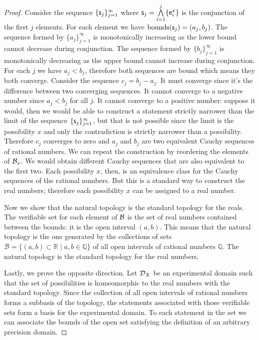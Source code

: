 \documentclass[11pt,letterpaper,fleqn]{memoir} %
\begin{document}
\begin{mathSection}
\begin{proof}
		Consider the sequence $\{\stmt_j\}_{j=1}^{\infty}$ where $\stmt_j = \bigAND\limits_{i=1}^j\{\obs[e]^x_i\}$ is the conjunction of the first $j$ elements. For each element we have $\operatorname{bounds}(\stmt_j) = (a_j, b_j)$. The sequence formed by $\{a_j\}_{j=1}^{\infty}$ is monotonically increasing as the lower bound cannot decrease during conjunction. The sequence formed by $\{b_j\}_{j=1}^{\infty}$ is monotonically decreasing as the upper bound cannot increase during conjunction. For each $j$ we have $a_j < b_j$, therefore both sequences are bound which means they both converge. Consider the sequence $c_j = b_j - a_j$. It must converge since it's the difference between two converging sequences. It cannot converge to a negative number since $a_j < b_j$ for all $j$. It cannot converge to a positive number: suppose it would, then we would be able to construct a statement strictly narrower than the limit of the sequence $\{\stmt_j\}_{j=1}^{\infty}$, but that is not possible since the limit is the possibility $x$ and only the contradiction is strictly narrower than a possibility. Therefore $c_j$ converges to zero and $a_j$ and $b_j$ are two equivalent Cauchy sequences of rational numbers. We can repeat the construction by reordering the elements of $\basis_x$. We would obtain different Cauchy sequences that are also equivalent to the first two. Each possibility $x$, then, is an equivalence class for the Cauchy sequences of the rational numbers. But this is a standard way to construct the real numbers; therefore each possibility $x$ can be assigned to a real number.
		
		Now we show that the natural topology is the standard topology for the reals. The verifiable set for each element of $\basis$ is the set of real numbers contained between the bounds: it is the open interval $(a,b)$. This means that the natural topology is the one generated by the collections of sets $\mathcal{B} = \{ (a,b) \subset \mathbb{R} \; | \; a,b \in \mathbb{Q} \}$ of all open intervals of rational numbers $\mathbb{Q}$. The natural topology is the standard topology for the real numbers.
		
		Lastly, we prove the opposite direction. Let $\edomain_X$ be an experimental domain such that the set of possibilities is homeomorphic to the real numbers with the standard topology. Since the collection of all open intervals of rational numbers forms a subbasis of the topology, the statements associated with those verifiable sets form a basis for the experimental domain. To each statement in the set we can associate the bounds of the open set satisfying the definition of an arbitrary precision domain.
	\end{proof}
	

\end{mathSection}
\end{document}

